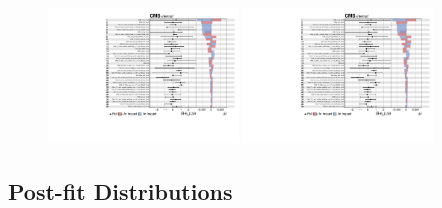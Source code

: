 \begin{figure}[htbp]
  \includegraphics[width=0.45\textwidth,page=5]{fig/fitValidation/impacts_VBFRadToWW1000_6p_72.pdf}
  \includegraphics[width=0.45\textwidth,page=6]{fig/fitValidation/impacts_VBFRadToWW1000_6p_72.pdf}\\
  \caption{
  }
  \label{fig:impacts_VBFRadToWW}
\end{figure}

\subsection{Post-fit Distributions}

